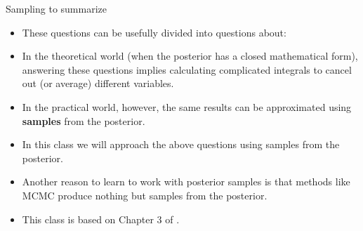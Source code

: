 \documentclass[handout]{beamer}
\begin{document}
\begin{frame}{Sampling to summarize}
\scriptsize{
\begin{itemize}

\item These questions can be usefully divided into questions about: 
 
\item In the theoretical world (when the posterior has a closed mathematical form), answering these questions implies calculating complicated integrals to cancel out (or average) different variables.

\item In the practical world, however, the same results can be approximated  using \textbf{samples} from the posterior. 
 
\item In this class we will approach the above questions using samples from the posterior. 

\item Another reason to learn to work with posterior samples is that methods like MCMC produce nothing but samples from the posterior.


\item This class is based on Chapter 3 of \cite{mcelreath2020statistical}.

\end{itemize}
}

\end{frame}
\end{document}
